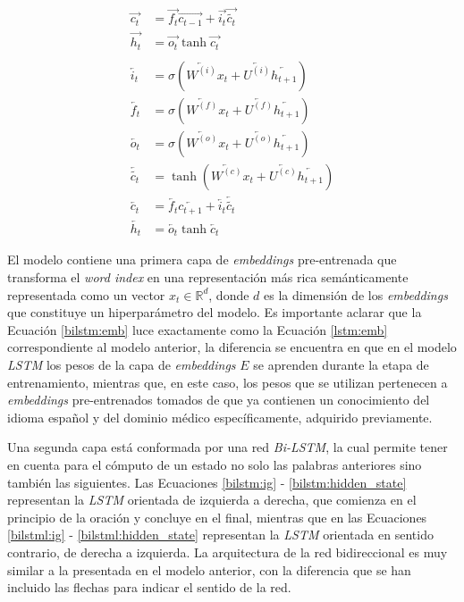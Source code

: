 \begin{align}
  \overrightarrow{c_{t}} &= \overrightarrow{f_{t}}\overrightarrow{c_{t-1}} + \overrightarrow{i_{t}}\overrightarrow{\tilde{c_{t}}} \label{bilstm:cell_state} \\
  \overrightarrow{h_{t}} &= \overrightarrow{o_{t}}\tanh{\overrightarrow{c_{t}}} \label{bilstm:hidden_state}\\
  \nonumber \\
  \overleftarrow{i_{t}} &= \sigma{(\overleftarrow{W^{(i)}} x_{t} + \overleftarrow{U^{(i)}}\overleftarrow{h_{t+1}})} \label{bilstml:ig} \\
  \overleftarrow{f_{t}} &= \sigma{(\overleftarrow{W^{(f)}} x_{t} + \overleftarrow{U^{(f)}}\overleftarrow{h_{t+1}})} \label{bilstml:fg} \\
  \overleftarrow{o_{t}} &= \sigma{(\overleftarrow{W^{(o)}} x_{t} + \overleftarrow{U^{(o)}}\overleftarrow{h_{t+1}})} \label{bilstml:og} \\
  \overleftarrow{\tilde{c_{t}}} &= \tanh(\overleftarrow{W^{(c)}} x_{t} + \overleftarrow{U^{(c)}}\overleftarrow{h_{t+1}}) \label{bilstml:new_memory_cell} \\
  \overleftarrow{c_{t}} &= \overleftarrow{f_{t}}\overleftarrow{c_{t+1}} + \overleftarrow{i_{t}}\overleftarrow{\tilde{c_{t}}} \label{bilstml:cell_state} \\
  \overleftarrow{h_{t}} &= \overleftarrow{o_{t}}\tanh{\overleftarrow{c_{t}}} \label{bilstml:hidden_state}
\end{align}

El modelo contiene una primera capa de \textit{embeddings} pre-entrenada que transforma el \textit{word index} en una representación más rica semánticamente representada como un vector $x_{t} \in {\mathbb{R}} ^{d}$, donde $d$ es la dimensión de los \textit{embeddings} que constituye un hiperparámetro del modelo. Es importante aclarar que la Ecuación \ref{bilstm:emb} luce exactamente como la Ecuación \ref{lstm:emb} correspondiente al modelo anterior, la diferencia se encuentra en que en el modelo \textit{LSTM} los pesos de la capa de \textit{embeddings} $E$ se aprenden durante la etapa de entrenamiento, mientras que, en este caso, los pesos que se utilizan pertenecen a \textit {embeddings} pre-entrenados tomados de \cite{2019-medical-fastext} que ya contienen un conocimiento del idioma español y del dominio médico específicamente, adquirido previamente.

Una segunda capa está conformada por una red \textit{Bi-LSTM}, la cual permite tener en cuenta para el cómputo de un estado no solo las palabras anteriores sino también las siguientes. Las Ecuaciones \ref{bilstm:ig} - \ref{bilstm:hidden_state} representan la \textit{LSTM} orientada de izquierda a derecha, que comienza en el principio de la oración y concluye en el final, mientras que en las Ecuaciones \ref{bilstml:ig} - \ref{bilstml:hidden_state} representan la \textit{LSTM} orientada en sentido contrario, de derecha a izquierda. La arquitectura de la red bidireccional es muy similar a la presentada en el modelo anterior, con la diferencia que se han incluido las flechas para indicar el sentido de la red.

